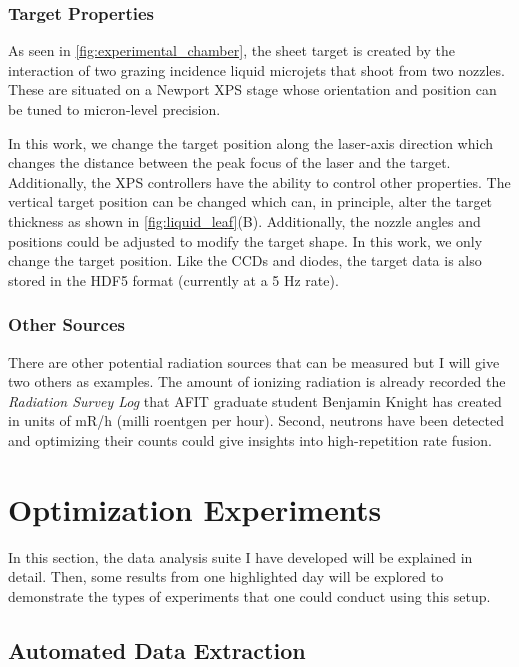 \subsubsection{Target Properties}

As seen in \autoref{fig:experimental_chamber}, the sheet target is created by the interaction of two grazing incidence liquid microjets that shoot from two nozzles. These  are situated on a Newport XPS stage whose orientation and position can be tuned to micron-level precision. 

In this work, we change the target position along the laser-axis direction which changes the distance between the peak focus of the laser and the target. Additionally, the XPS controllers have the ability to control other properties. The vertical target position can be changed which can, in principle, alter the target thickness as shown in \autoref{fig:liquid_leaf}(B). Additionally, the nozzle angles and positions could be adjusted to modify the target shape. In this work, we only change the target position. Like the \gls{CCD}s and diodes, the target data is also stored in the \gls{HDF5} format (currently at a 5 Hz rate).

\subsubsection{Other Sources}
There are other potential radiation sources that can be measured but I will give two others as examples. The amount of ionizing radiation is already recorded the \emph{Radiation Survey Log} that AFIT graduate student Benjamin Knight has created in units of mR/h (milli roentgen per hour). Second, neutrons have been detected \cite{Knight_2024_HPLSE} and optimizing their counts could give insights into high-repetition rate fusion.

\section{Optimization Experiments} \label{sec:daq_results}

In this section, the data analysis suite I have developed will be explained in detail. Then, some results from one highlighted day will be explored to demonstrate the types of experiments that one could conduct using this setup.

\subsection{Automated Data Extraction}

